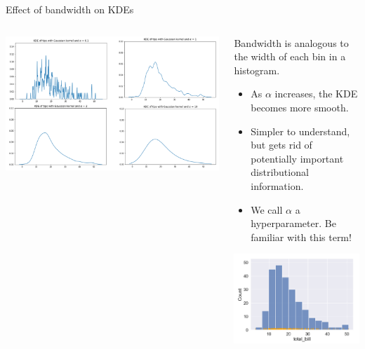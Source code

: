 \documentclass[aspectratio=169]{../latex_main/tntbeamer}  %
\begin{document}
	
	\begin{frame}{Effect of bandwidth on KDEs}
	    \begin{columns}
	        \begin{column}{.5\textwidth}

	                    \centering
	                    \includegraphics[scale=.3]{Bild91}

	        \end{column}
	        
	        
	        \begin{column}{.5\textwidth}

                    \vspace{-2em}
	                Bandwidth is analogous to the width of each bin in a histogram.
	                \begin{itemize}
	                    \item As $\alpha$ increases, the KDE becomes more smooth.
	                    \item Simpler to understand, but gets rid of potentially important distributional information.
	                    \item We call $\alpha$ a \alert{hyperparameter}. Be familiar with this term!
	                \end{itemize}
	                    \centering
	                    \includegraphics[scale=.28]{Bild92}

	        \end{column}
	    \end{columns}
	\end{frame}
	
\end{document}
